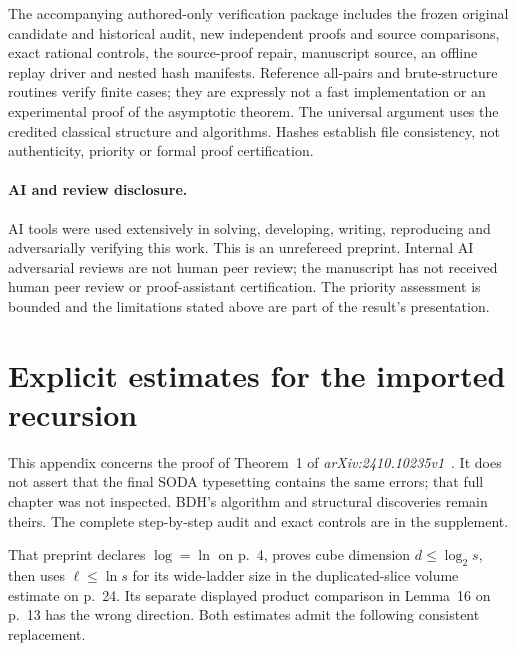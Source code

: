 \documentclass[11pt]{article}
\begin{document}
The accompanying authored-only verification package includes the frozen
original candidate and historical audit, new independent proofs and
source comparisons, exact rational controls, the source-proof repair,
manuscript source, an offline replay driver and nested hash manifests.
Reference all-pairs and brute-structure routines verify finite cases;
they are expressly not a fast implementation or an experimental proof
of the asymptotic theorem. The universal argument uses the credited
classical structure and algorithms. Hashes establish file consistency,
not authenticity, priority or formal proof certification.

\paragraph{AI and review disclosure.}
AI tools were used extensively in solving, developing, writing,
reproducing and adversarially verifying this work. This is an
unrefereed preprint. Internal AI adversarial reviews are not human peer
review; the manuscript has not received human peer review or
proof-assistant certification. The priority assessment is bounded and
the limitations stated above are part of the result's presentation.

\appendix
\section{Explicit estimates for the imported recursion}\label{app:repair}
This appendix concerns the proof of Theorem~1 of
\emph{arXiv:2410.10235v1}~\cite{BDHarxiv}. It does not assert that the
final SODA typesetting contains the same errors; that full chapter was
not inspected. BDH's algorithm and structural discoveries remain theirs.
The complete step-by-step audit and exact controls are in the supplement.

That preprint declares $\log=\ln$ on p.~4, proves cube dimension
$d\leq\log_2 s$, then uses $\ell\leq\ln s$ for its wide-ladder size in
the duplicated-slice volume estimate on p.~24. Its separate displayed
product comparison in Lemma~16 on p.~13 has the wrong direction.
Both estimates admit the following consistent replacement.
\end{document}
